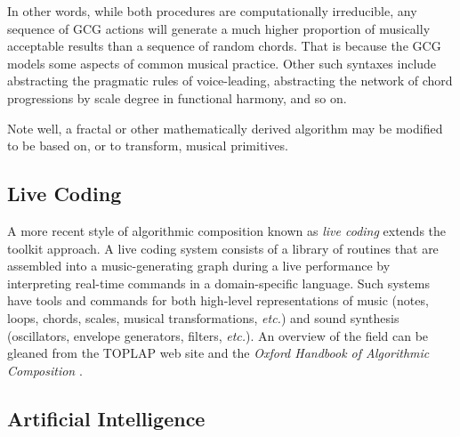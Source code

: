 \documentclass[11pt,papersize=a4]{scrartcl}
\begin{document}
In other words, while both procedures are computationally irreducible, any sequence of GCG actions will generate a much higher proportion of musically acceptable results than a sequence of random chords. That is because the GCG models some aspects of common musical practice. Other such syntaxes include abstracting the pragmatic rules of voice-leading, abstracting the network of chord progressions by scale degree in functional harmony, and so on.

Note well, a fractal or other mathematically derived algorithm may be modified to be based on, or to transform, musical primitives.

\subsection*{Live Coding}

A more recent style of algorithmic composition known as \emph{live coding} extends the toolkit approach. A live coding system consists of a library of routines that are assembled into a music-generating graph during a live performance by interpreting real-time commands in a domain-specific language. Such systems have tools and commands for both high-level representations of music (notes, loops, chords, scales, musical transformations, \emph{etc.}) and sound synthesis (oscillators, envelope generators, filters, \emph{etc.}). An overview of the field can be gleaned from the TOPLAP web site \parencite{toplap} and the \emph{Oxford Handbook of Algorithmic Composition} \parencite{mclean2018oxford}.

\subsection*{Artificial Intelligence}
\end{document}
